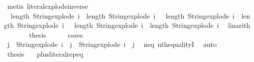 \begin{isabellebody}
\ {\isacharparenleft}{\kern0pt}metis\ literal{\isachardot}{\kern0pt}explode{\isacharunderscore}{\kern0pt}inverse{\isacharparenright}{\kern0pt}\isanewline
\isanewline
\ \ \ \ \isamarkupfalse%
\ {\isacharparenleft}{\kern0pt}{}{\isacharparenright}{\kern0pt}\ {\isachardoublequoteopen}length\ {\isacharparenleft}{\kern0pt}String{\isachardot}{\kern0pt}explode\ i{\isacharparenright}{\kern0pt}\ {\isacharequal}{\kern0pt}\ length\ {\isacharparenleft}{\kern0pt}String{\isachardot}{\kern0pt}explode\ i{\isacharprime}{\kern0pt}{\isacharparenright}{\kern0pt}{\isachardoublequoteclose}\ {\isacharbar}{\kern0pt}\ {\isacharparenleft}{\kern0pt}{}{\isacharparenright}{\kern0pt}\ {\isachardoublequoteopen}length\ {\isacharparenleft}{\kern0pt}String{\isachardot}{\kern0pt}explode\ i{\isacharparenright}{\kern0pt}\ {\isacharless}{\kern0pt}\ length\ {\isacharparenleft}{\kern0pt}String{\isachardot}{\kern0pt}explode\ i{\isacharprime}{\kern0pt}{\isacharparenright}{\kern0pt}{\isachardoublequoteclose}\ {\isacharbar}{\kern0pt}\ {\isacharparenleft}{\kern0pt}{}{\isacharparenright}{\kern0pt}\ {\isachardoublequoteopen}length\ {\isacharparenleft}{\kern0pt}String{\isachardot}{\kern0pt}explode\ i{\isacharparenright}{\kern0pt}\ {\isachargreater}{\kern0pt}\ length\ {\isacharparenleft}{\kern0pt}String{\isachardot}{\kern0pt}explode\ i{\isacharprime}{\kern0pt}{\isacharparenright}{\kern0pt}{\isachardoublequoteclose}\ \isamarkupfalse%
\ linarith\isanewline
\ \ \ \ \isamarkupfalse%
\ \isamarkupfalse%
\ {\isacharquery}{\kern0pt}thesis\isanewline
\ \ \ \ \isamarkupfalse%
\ {\isacharparenleft}{\kern0pt}cases{\isacharparenright}{\kern0pt}\isanewline
\ \ \ \ \ \ \isamarkupfalse%
\ {}\isanewline
\ \ \ \ \ \ \isamarkupfalse%
\ \isamarkupfalse%
\ j\ \ {\isachardoublequoteopen}String{\isachardot}{\kern0pt}explode\ i\ {\isacharbang}{\kern0pt}\ j\ {\isasymnoteq}\ String{\isachardot}{\kern0pt}explode\ i{\isacharprime}{\kern0pt}\ {\isacharbang}{\kern0pt}\ j{\isachardoublequoteclose}\ \isamarkupfalse%
\ neq\ nth{\isacharunderscore}{\kern0pt}equalityI\ \isamarkupfalse%
\ auto\isanewline
\ \ \ \ \ \ \isamarkupfalse%
\ \isamarkupfalse%
\ {\isacharquery}{\kern0pt}thesis\ \isamarkupfalse%
\ {}\ plus{\isacharunderscore}{\kern0pt}literal{\isachardot}{\kern0pt}rep{\isacharunderscore}{\kern0pt}eq\ \isamarkupfalse%

\end{isabellebody}
